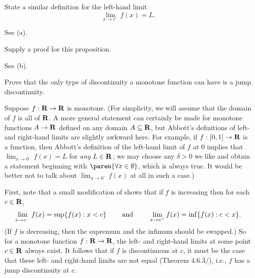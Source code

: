 \documentclass{lew98_solutions}
\begin{document}
\begin{exercise}
\label{ex:4.6.3}
    State a similar definition for the left-hand limit
    \[
        \lim_{x \to c^-} f(x) = L.
    \]
\end{exercise}

\begin{solution}
    See  (a).
\end{solution}

\begin{exercise}
\label{ex:4.6.4}
    Supply a proof for this proposition.
\end{exercise}

\begin{solution}
    See  (b).
\end{solution}

\begin{exercise}
\label{ex:4.6.5}
    Prove that the only type of discontinuity a monotone function can have is a jump discontinuity.
\end{exercise}

\begin{solution}
    Suppose \( f : \mathbf{R} \to \mathbf{R} \) is monotone. (For simplicity, we will assume that the domain of \( f \) is all of \( \mathbf{R} \). A more general statement can certainly be made for monotone functions \( A \to \mathbf{R} \) defined on any domain \( A \subseteq \mathbf{R} \), but Abbott's definitions of left- and right-hand limits are slightly awkward here. For example, if \( f : [0, 1] \to \mathbf{R} \) is a function, then Abbott's definition of the left-hand limit of \( f \) at 0 implies that \( \lim_{x \to 0^-} f(x) = L \) for \textit{any} \( L \in \mathbf{R} \); we may choose any \( \delta > 0 \) we like and obtain a statement beginning with \( \paren{\forall x \in \emptyset} \), which is always true. It would be better not to talk about \( \lim_{x \to 0^-} f(x) \) at all in such a case.)

    First, note that a small modification of  shows that if \( f \) is increasing then for each \( c \in \mathbf{R} \),
    \[
        \lim_{x \to c^-} f(x) = \sup \{ f(x) : x < c \} \hspace{8mm} \text{and} \hspace{8mm} \lim_{x \to c^+} f(x) = \inf \{ f(x) : c < x \}.
    \]
    (If \( f \) is decreasing, then the supremum and the infimum should be swapped.) So for a monotone function \( f : \mathbf{R} \to \mathbf{R} \), the left- and right-hand limits at some point \( c \in \mathbf{R} \) always exist. It follows that if \( f \) is discontinuous at \( c \), it must be the case that these left- and right-hand limits are not equal (Theorem 4.6.3/), i.e., \( f \) has a jump discontinuity at \( c \).
\end{solution}
\end{document}
